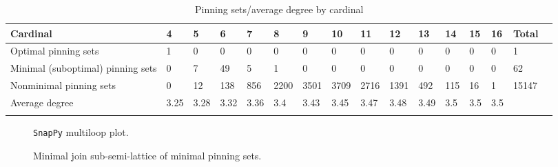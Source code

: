 \documentclass{article}%
\begin{document}
\begin{table}[ht]
	\caption{Pinning sets/average degree by cardinal}
	\centering
	\renewcommand{\arraystretch}{1.5}
	\begin{tabularx}{\textwidth}{lXXXXXXXXXXXXXXX}
		\toprule
			Cardinal & 4 & 5 & 6 & 7 & 8 & 9 & 10 & 11 & 12 & 13 & 14 & 15 & 16 & Total\\
			\hline
			Optimal pinning sets & 1 & 0 & 0 & 0 & 0 & 0 & 0 & 0 & 0 & 0 & 0 & 0 & 0 & 1 \\
			Minimal (suboptimal) pinning sets & 0 & 7 & 49 & 5 & 1 & 0 & 0 & 0 & 0 & 0 & 0 & 0 & 0 & 62 \\
			Nonminimal pinning sets & 0 & 12 & 138 & 856 & 2200 & 3501 & 3709 & 2716 & 1391 & 492 & 115 & 16 & 1 & 15147 \\
			Average degree & 3.25 & 3.28 & 3.32 & 3.36 & 3.4 & 3.43 & 3.45 & 3.47 & 3.48 & 3.49 & 3.5 & 3.5 & 3.5 &  \\
		\bottomrule \\ 
	\end{tabularx}
\end{table}

\begin{multicols}{2}
\begin{figure}[H]
\centering

\caption{\texttt{SnapPy} multiloop plot.}
\label{fig:tex/img/[[28, 21, 1, 22], [22, 8, 23, 7], [27, 10, 28, 11], [20, 9, 21, 10], [1, 9, 2, 8], [23, 19, 24, 18], [6, 11, 7, 12], [26, 15, 27, 16], [19, 2, 20, 3], [24, 14, 25, 13], [17, 12, 18, 13], [5, 16, 6, 17.svg}
\end{figure}
\columnbreak

\begin{figure}[H]
\centering
\scalebox{0.8}{}
\caption{Minimal join sub-semi-lattice of minimal pinning sets.}
\label{fig:tex/img/[[28, 21, 1, 22], [22, 8, 23, 7], [27, 10, 28, 11], [20, 9, 21, 10], [1, 9, 2, 8], [23, 19, 24, 18], [6, 11, 7, 12], [26, 15, 27, 16], [19, 2, 20, 3], [24, 14, 25, 13], [17, 12, 18, 13], [5, 16, 6, 17.pgf}
\end{figure}
\end{multicols}
\end{document}
